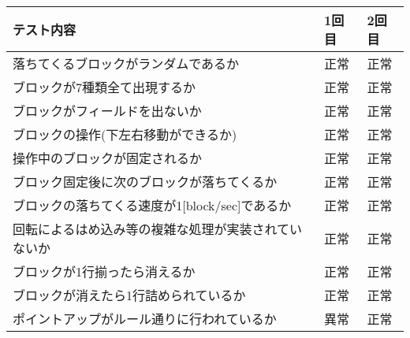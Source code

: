 \begin{table}[htb]
\begin{tabular}{|l|l|l|}
\hline
テスト内容                             & 1回目 & 2回目 \\ \hline
落ちてくるブロックがランダムであるか                & 正常  & 正常  \\ \hline
ブロックが7種類全て出現するか                   & 正常  & 正常  \\ \hline
ブロックがフィールドを出ないか                   & 正常  & 正常  \\ \hline
ブロックの操作(下左右移動ができるか)               & 正常  & 正常  \\ \hline
操作中のブロックが固定されるか                   & 正常  & 正常  \\ \hline
ブロック固定後に次のブロックが落ちてくるか             & 正常  & 正常  \\ \hline
ブロックの落ちてくる速度が1{[}block/sec{]}であるか & 正常  & 正常  \\ \hline
回転によるはめ込み等の複雑な処理が実装されていないか        & 正常  & 正常  \\ \hline
ブロックが1行揃ったら消えるか                   & 正常  & 正常  \\ \hline
ブロックが消えたら1行詰められているか               & 正常  & 正常  \\ \hline
ポイントアップがルール通りに行われているか             & 異常  & 正常  \\ \hline
\end{tabular}
\end{table}
